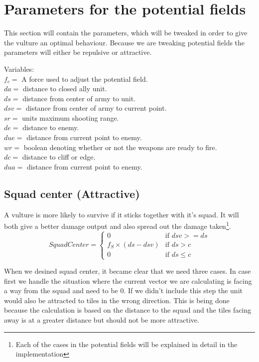 \section{Parameters for the potential fields}
	This section will contain the parameters, which will be tweaked in order to give the vulture an optimal behaviour. Because we are tweaking 
	potential fields the parameters will either be repulsive or attractive.
	
	Variables:\\
	$f_c =$ A force used to adjust the potential field.\\
	$da =$ distance to closed ally unit.\\
	$ds =$ distance from center of army to unit.\\
	$dsv =$ distance from center of army to current point.\\
	$sr =$ units maximum shooting range.\\
	$de =$ distance to enemy.\\
	$due =$ distance from current point to enemy.\\
	$wr =$ boolean denoting whether or not the weapons are ready to fire.\\
	$dc =$ distance to cliff or edge. \\
	$dua =$ distance from current point to enemy.
	
	\subsection*{Squad center (Attractive)}
		\label{SCA_label}A vulture is more likely to survive if it sticks together with it's squad. It will both give a better damage output and also spread out the 
		damage taken\footnote{Each of the cases in the potential fields will be explained in detail in the implementation}.
		\begin{displaymath}
			SquadCenter  = \begin{cases}
					0 & \text{if } dsv >= ds\\
					f_{S} \times (ds - dsv) & \text{if } ds > c\\
					0 & \text{if } ds \leq c
				\end{cases}		
		\end{displaymath}
		
		When we desined squad center, it became clear that we need three cases. 
		In case first we handle the situation where the current vector we are calculating is facing a way from the squad and need to be 0. If we didn't include this step the unit would also be attracted to tiles in the wrong direction. This is being done because the calculation is based on the distance to the squad and the tiles facing away is at a greater distance but should not be more attractive.
		
